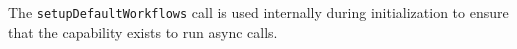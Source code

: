 The \verb+setupDefaultWorkflows+ call is used internally during \Rapture initialization to ensure
that the capability exists to run async calls.
